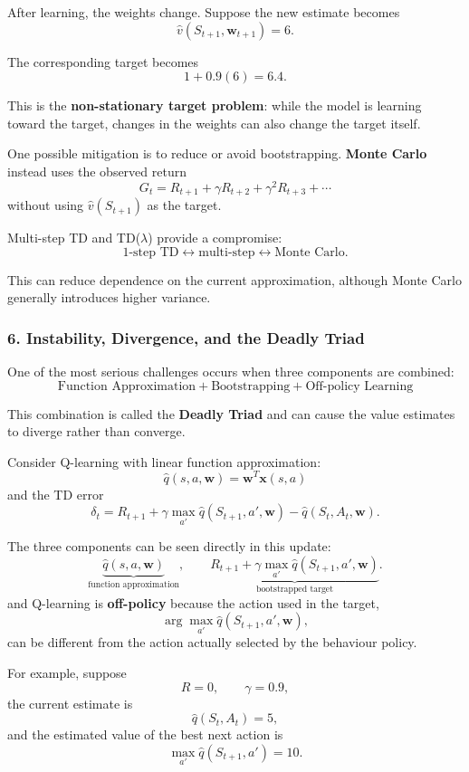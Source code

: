 \documentclass{scrartcl}
\theoremstyle{mytheoremstyle}
\theoremstyle{mytheoremstyle}
\theoremstyle{myproblemstyle}
\begin{document}
After learning, the weights change. Suppose the new estimate becomes
\[
    \hat v(S_{t+1},\mathbf w_{t+1})=6.
\]

The corresponding target becomes
\[
    1+0.9(6)=6.4.
\]

This is the \textbf{non-stationary target problem}: while the model is learning toward the target, changes in the weights can also change the target itself.

One possible mitigation is to reduce or avoid bootstrapping. \textbf{Monte Carlo} instead uses the observed return
\[
    G_t = R_{t+1}+\gamma R_{t+2}+\gamma^2R_{t+3}+\cdots
\]
without using $\hat v(S_{t+1})$ as the target.

Multi-step TD and TD($\lambda$) provide a compromise:
\[
    \text{1-step TD}
    \longleftrightarrow
    \text{multi-step}
    \longleftrightarrow
    \text{Monte Carlo}.
\]

This can reduce dependence on the current approximation, although Monte Carlo generally introduces higher variance.

\subsubsection*{6. Instability, Divergence, and the Deadly Triad}

One of the most serious challenges occurs when three components are combined:
\[
    \boxed{
        \text{Function Approximation}
        +
        \text{Bootstrapping}
        +
        \text{Off-policy Learning}
    }
\]

This combination is called the \textbf{Deadly Triad} and can cause the value estimates to diverge rather than converge.

Consider Q-learning with linear function approximation:
\[
    \hat q(s,a,\mathbf w)=\mathbf w^T\mathbf x(s,a)
\]
and the TD error
\[
    \delta_t =
    R_{t+1}
    +\gamma\max_{a'}\hat q(S_{t+1},a',\mathbf w)
    -\hat q(S_t,A_t,\mathbf w).
\]

The three components can be seen directly in this update:
\[
    \underbrace{\hat q(s,a,\mathbf w)}
    _{\text{function approximation}},
    \qquad
    \underbrace{
        R_{t+1}+\gamma\max_{a'}\hat q(S_{t+1},a',\mathbf w)
    }_{\text{bootstrapped target}}.
\]
and Q-learning is \textbf{off-policy} because the action used in the target,
\[
    \arg\max_{a'}\hat q(S_{t+1},a',\mathbf w),
\]
can be different from the action actually selected by the behaviour policy.

For example, suppose
\[
    R=0,\qquad \gamma=0.9,
\]
the current estimate is
\[
    \hat q(S_t,A_t)=5,
\]
and the estimated value of the best next action is
\[
    \max_{a'}\hat q(S_{t+1},a')=10.
\]
\end{document}
